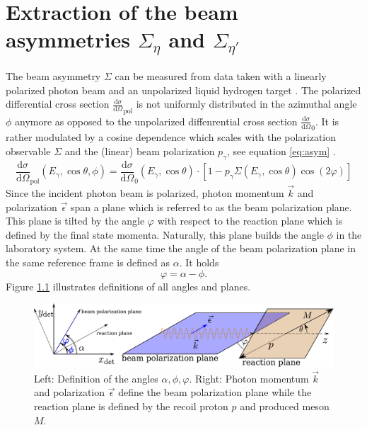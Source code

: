 
\chapter{Extraction of the beam asymmetries $\Sigma_{\eta}$ and $\Sigma_{\eta'}$}
The beam asymmetry $\Sigma$ can be measured from data taken with a linearly polarized photon beam and an unpolarized liquid hydrogen target \cite{san}. The polarized differential cross section $\frac{\text{d}\sigma}{\text{d}\Omega}_\text{pol}$ is not uniformly distributed in the azimuthal angle $\phi$ anymore as opposed to the unpolarized diffenrential cross section $\frac{\text{d}\sigma}{\text{d}\Omega}_0$. It is rather modulated by a cosine dependence which scales with the polarization observable $\Sigma$ and the (linear) beam polarization $p_\gamma$, see equation \eqref{eq:asym} \cite{san}.
\begin{equation}
	\frac{\text{d}\sigma}{\text{d}\Omega}_\text{pol}\left(E_\gamma,\cos\theta,\phi\right)=\frac{\text{d}\sigma}{\text{d}\Omega}_0\left(E_\gamma,\cos\theta\right)\cdot\left[1-p_\gamma\Sigma\left(E_\gamma,\cos\theta\right)\cos\left(2\varphi\right)\right]
	\label{eq:asym}
\end{equation}
Since the incident photon beam is polarized, photon momentum $\vec{k}$ and polarization $\vec{\epsilon}$ span a plane which is referred to as the beam polarization plane. This plane is tilted by the angle $\varphi$ with respect to the reaction plane which is defined by the final state momenta. Naturally, this plane builds the angle $\phi$ in the laboratory system. At the same time the angle of the beam polarization plane in the same reference frame is defined as $\alpha$. It holds 
\begin{equation}
	\varphi=\alpha-\phi.
\end{equation} Figure \ref{fig:angles} illustrates definitions of all angles and planes. 
 \begin{figure}[htbp]
	\centering
	\includegraphics[width=\linewidth]{../DPG2022/figs/angles.pdf}
	\caption{Left: Definition of the angles $\alpha,\phi,\varphi$. Right: Photon momentum $\vec{k}$ and polarization  $\vec{\epsilon}$ define the beam polarization plane while the reaction plane is defined by the recoil proton $p$ and produced meson $M$.}
	\label{fig:angles}
\end{figure} 
